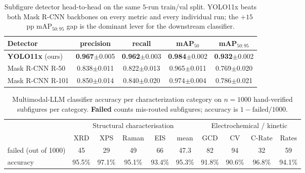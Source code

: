 \documentclass{article}
\begin{document}
\begin{table}[h]
\centering
\caption{Subfigure detector head-to-head on the same $5$-run
train/val split. YOLO11x beats both Mask R-CNN backbones on every
metric and every individual run; the $+15$\,pp mAP$_{50:95}$ gap
is the dominant lever for the downstream classifier.}
\label{tab:subfig-detector}
\small
\begin{tabular}{lcccc}
\toprule
Detector & precision & recall & mAP$_{50}$ & mAP$_{50:95}$ \\
\midrule
\textbf{YOLO11x} (ours)     & \textbf{0.967}$\pm$0.005 & \textbf{0.962}$\pm$0.003 & \textbf{0.984}$\pm$0.002 & \textbf{0.932}$\pm$0.002 \\
Mask R-CNN R-50            & 0.838$\pm$0.011          & 0.822$\pm$0.013          & 0.965$\pm$0.011          & 0.769$\pm$0.020          \\
Mask R-CNN R-101           & 0.850$\pm$0.014          & 0.840$\pm$0.020          & 0.974$\pm$0.004          & 0.786$\pm$0.021          \\
\bottomrule
\end{tabular}
\end{table}

\begin{table}[h]
\centering
\caption{Multimodal-LLM classifier accuracy per characterization
category on $n{=}1000$ hand-verified subfigures per category.
\textbf{Failed} counts mis-routed subfigures; accuracy is
$1{-}\text{failed}/1000$.}
\label{tab:doc-pipeline-classify}
\small
\begin{tabular}{lccccc|cccc}
\toprule
& \multicolumn{5}{c|}{Structural characterisation} & \multicolumn{4}{c}{Electrochemical / kinetic} \\
& XRD & XPS & Raman & EIS & mean & GCD & CV & C-Rate & Rates \\
\midrule
failed (out of 1000) & 45 & 29 & 49 & 66 & 47.3 & 82 & 94 & 32 & 59 \\
accuracy             & 95.5\% & 97.1\% & 95.1\% & 93.4\% & 95.3\% & 91.8\% & 90.6\% & 96.8\% & 94.1\% \\
\bottomrule
\end{tabular}
\end{table}
\end{document}
